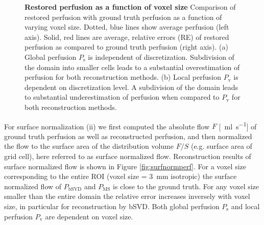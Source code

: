\documentclass[10pt]{article}
\begin{document}
\begin{figure}[!h]
\caption{{\bf Restored perfusion as a function of voxel size}
Comparison of restored perfusion with ground truth perfusion as a function of varying voxel size. Dotted, blue lines show average perfusion (left axis). Solid, red lines are average, relative errors (RE) of restored perfusion as compared to ground truth perfusion (right axis). (a) Global perfusion $P_{\mathrm{s}}$ is independent of discretization.  Subdivision of the domain into smaller cells leads to a substantial overestimation of perfusion for both reconstruction methods. (b) Local perfusion $P_{\mathrm{v}}$ is dependent on discretization level. A subdivision of the domain leads to substantial underestimation of perfusion when compared to $P_{\mathrm{v}}$ for both reconstruction methods.}
\label{fig:volnormperf}
\end{figure}


    
For surface normalization (ii) we first computed the absolute flow $F$ [\SI{}{\milli\litre\per\second}] of ground truth perfusion as well as reconstructed perfusion, and then normalized the flow to the surface area of the distribution volume $F/S$ (e.g. surface area of grid cell), here referred to as surface normalized flow. 
Reconstruction results of surface normalized flow is shown in Figure \ref{fig:surfnormperf}. For a voxel size corresponding to the entire ROI (voxel size = \SI{3}{\milli\meter} isotropic) the surface normalized flow of $P_{\mathrm{bSVD}}$ and $P_{\mathrm{MS}}$ is close to the ground truth. For any voxel size smaller than the entire domain the relative error increases inversely with voxel size, in particular for reconstruction by bSVD. Both global perfusion $P_{\mathrm{s}}$ and local perfusion $P_{\mathrm{v}}$ are dependent on voxel size.
\end{document}
